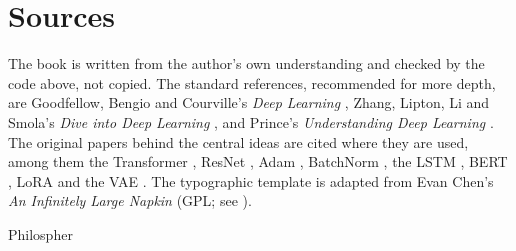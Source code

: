 \section*{Sources}
The book is written from the author's own understanding and checked by the code above, not copied.
The standard references, recommended for more depth, are Goodfellow, Bengio and Courville's
\emph{Deep Learning} \cite{goodfellow}, Zhang, Lipton, Li and Smola's \emph{Dive into Deep Learning}
\cite{d2l}, and Prince's \emph{Understanding Deep Learning} \cite{prince}. The original papers behind
the central ideas are cited where they are used, among them the Transformer \cite{vaswani}, ResNet
\cite{resnet}, Adam \cite{adam}, BatchNorm \cite{batchnorm}, the LSTM \cite{lstm}, BERT \cite{bert},
LoRA \cite{lora} and the VAE \cite{vae}. The typographic template is adapted from Evan Chen's
\emph{An Infinitely Large Napkin} (GPL; see ).

\medskip
\hfill Philospher
